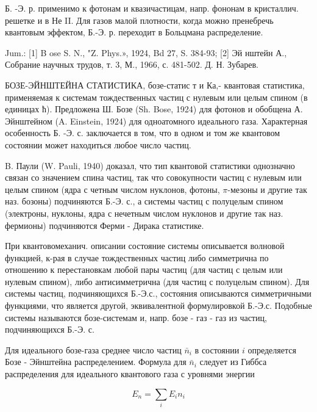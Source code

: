 \documentclass[10pt]{article}
\begin{document}
Б. -Э. р. применимо к фотонам и квазичастицам, напр. фононам в кристаллич. решетке и в Не II. Для газов малой плотности, когда можно пренебречь квантовым эффектом, Б.-Э. р. переходит в Больцмана распределение.



Jum.: [1] B ose S. N., "Z. Phys.», 1924, Bd 27, S. 384-93; [2] Эй нштейн А., Собрание научных трудов, т. 3, М., 1966, с. 481-502. Д. Н. Зубарев.



БОЗЕ-ЭЙНШТЕЙНА СТАТИСТИКА, бозе-статис т и Ка,- квантовая статистика, применяемая к системам тождественных частиц с нулевым или целым спином (в единицах ћ). Предложена Ш. Бозе (Sh. Bose, 1924) для фотонов и обобщена А. Эйнштейном (A. Einstein, 1924) для одноатомного идеального газа. Характерная особенность Б. -Э. с. заключается в том, что в одном и том же квантовом состоянии может находиться любое число частиц.



B. Паули (W. Pauli, 1940) доказал, что тип квантовой статистики однозначно связан со значением спина частиц, так что совокупности частиц с нулевым или целым спином (ядра с четным числом нуклонов, фотоны, $\pi$-мезоны и другие так наз. бозоны) подчиняются Б.-Э. с., а системы частиц с полуцелым спином (электроны, нуклоны, ядра с нечетным числом нуклонов и другие так наз. фермионы) подчиняются Ферми - Дирака статистике.



При квантовомеханич. описании состояние системы описывается волновой функцией, к-рая в случае тождественных частиц либо симметрична по отношению к перестановкам любой пары частиц (для частиц с целым или нулевым спином), либо антисимметрична (для частиц с полуцелым спином). Для системы частиц, подчиняющихся Б.-Э.с., состояния описываются симметричными функциями, что является другой, эквивалентной формулировкой Б.-Э.с. Подобные системы называются бозе-системам и, напр. бозе - газ - газ из частиц, подчиняющихся Б.-Э. с.



Для идеального бозе-газа среднее число частиц $\bar{n}_{i}$ в состоянии $i$ определяется Бозе - Эйнштейна распределением. Формула для $\bar{n}_{i}$ следует из Гиббса распределения для идеального квантового газа с уровнями энергии



\[

E_{n}=\sum_{i} E_{i} n_{i}

\]
\end{document}
